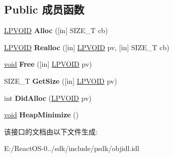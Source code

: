 \subsection*{Public 成员函数}
\begin{DoxyCompactItemize}
\item 
\mbox{\label{interface_i_malloc_a7d7bb333938adb5169e23627d548d6da}} 
\hyperlink{interfacevoid}{L\+P\+V\+O\+ID} {\bfseries Alloc} (\mbox{[}in\mbox{]} S\+I\+Z\+E\+\_\+T cb)
\item 
\mbox{\label{interface_i_malloc_a8e04be95653aeebbc4d04a946f03d77a}} 
\hyperlink{interfacevoid}{L\+P\+V\+O\+ID} {\bfseries Realloc} (\mbox{[}in\mbox{]} \hyperlink{interfacevoid}{L\+P\+V\+O\+ID} pv, \mbox{[}in\mbox{]} S\+I\+Z\+E\+\_\+T cb)
\item 
\mbox{\label{interface_i_malloc_ac6097f69995e1f6f2f7796dd39caa10f}} 
\hyperlink{interfacevoid}{void} {\bfseries Free} (\mbox{[}in\mbox{]} \hyperlink{interfacevoid}{L\+P\+V\+O\+ID} pv)
\item 
\mbox{\label{interface_i_malloc_a00c00091309e060baf5d33b729e58e55}} 
S\+I\+Z\+E\+\_\+T {\bfseries Get\+Size} (\mbox{[}in\mbox{]} \hyperlink{interfacevoid}{L\+P\+V\+O\+ID} pv)
\item 
\mbox{\label{interface_i_malloc_af44cddd1b9a5e15f0761d2b2b09c9399}} 
int {\bfseries Did\+Alloc} (\hyperlink{interfacevoid}{L\+P\+V\+O\+ID} pv)
\item 
\mbox{\label{interface_i_malloc_aefc90e88a27478d2e57bdd249c5d1695}} 
\hyperlink{interfacevoid}{void} {\bfseries Heap\+Minimize} ()
\end{DoxyCompactItemize}


该接口的文档由以下文件生成\+:\begin{DoxyCompactItemize}
\item 
E\+:/\+React\+O\+S-\/0../sdk/include/psdk/objidl.\+idl\end{DoxyCompactItemize}
